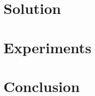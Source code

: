 \documentclass[letterpaper,12pt,titlepage,oneside,final]{book}
\let\origdoublepage\cleardoublepage
\newcommand{\clearemptydoublepage}{%
  \clearpage{\pagestyle{empty}\origdoublepage}}
\let\cleardoublepage\clearemptydoublepage
\begin{document}
\chapter{Solution}



\chapter{Experiments}



\chapter{Conclusion}






\cleardoublepage %
\renewcommand*{\bibname}{References}



\end{document}
